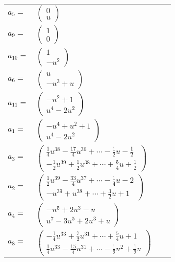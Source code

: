 \documentclass[1p]{elsarticle_modified}
\theoremstyle{definition}
\begin{document}
\begin{tabular}{m{7pt} m{180pt} m{7pt} m{180pt} }
\flushright $a_{5}=$&$\begin{pmatrix}0\\u\end{pmatrix}$ \\
\flushright $a_{9}=$&$\begin{pmatrix}1\\0\end{pmatrix}$ \\
\flushright $a_{10}=$&$\begin{pmatrix}1\\- u^2\end{pmatrix}$ \\
\flushright $a_{6}=$&$\begin{pmatrix}u\\- u^3+u\end{pmatrix}$ \\
\flushright $a_{11}=$&$\begin{pmatrix}- u^2+1\\u^4-2 u^2\end{pmatrix}$ \\
\flushright $a_{1}=$&$\begin{pmatrix}- u^4+u^2+1\\u^4-2 u^2\end{pmatrix}$ \\
\flushright $a_{3}=$&$\begin{pmatrix}\frac{1}{4} u^{38}-\frac{17}{4} u^{36}+\cdots-\frac{1}{2} u-\frac{1}{2}\\-\frac{1}{2} u^{39}+\frac{1}{2} u^{38}+\cdots+\frac{5}{4} u+\frac{1}{2}\end{pmatrix}$ \\
\flushright $a_{2}=$&$\begin{pmatrix}\frac{1}{2} u^{39}-\frac{33}{4} u^{37}+\cdots-\frac{1}{4} u-2\\- u^{39}+u^{38}+\cdots+\frac{3}{2} u+1\end{pmatrix}$ \\
\flushright $a_{4}=$&$\begin{pmatrix}- u^5+2 u^3- u\\u^7-3 u^5+2 u^3+u\end{pmatrix}$ \\
\flushright $a_{8}=$&$\begin{pmatrix}-\frac{1}{4} u^{33}+\frac{7}{2} u^{31}+\cdots+\frac{5}{4} u+1\\\frac{1}{4} u^{33}-\frac{15}{4} u^{31}+\cdots-\frac{1}{2} u^2+\frac{1}{2} u\end{pmatrix}$ \\

\end{tabular}
\end{document}
